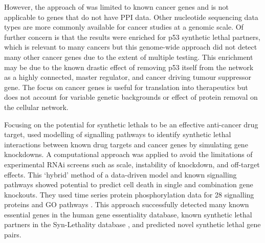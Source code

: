However, the approach of \citet{Kranthi2013} was limited to known \glspl{cancer gene} and is not applicable to genes that do not have \gls{PPI} data. Other nucleotide sequencing data types are more commonly available for cancer studies at a \gls{genomic} scale. Of further concern is that the results were enriched for p53 \gls{synthetic lethal} partners, which is relevant to many \glspl{cancer} but this \gls{genome}-wide approach did not detect many other \glspl{cancer gene} due to the extent of multiple testing. This enrichment may be due to the known drastic effect of removing p53 itself from the network as a highly connected, master regulator, and cancer driving \gls{tumour suppressor} gene. The focus on \glspl{cancer gene} is useful for translation into therapeutics but does not account for variable genetic backgrounds or effect of protein removal on the cellular network.  

Focusing on the potential for \glspl{synthetic lethal} to be an effective anti-cancer drug target, \citet{Zhang2015} used modelling of signalling pathways to identify \gls{synthetic lethal} interactions between known drug targets and \glspl{cancer gene} by simulating gene knockdowns. A computational approach was applied to avoid the limitations of experimental \gls{RNAi} screens such as scale, instability of knockdown, and off-target effects. This `hybrid' method of a data-driven model and known signalling pathways showed potential to predict cell death in single and combination gene knockouts. They used time series protein phosphorylation data \citep{Lee2012} for 28 signalling proteins and \gls{GO} \glspl{pathway} \citep{Ashburner2000, Blake2015}. This approach successfully detected many known \gls{essential} genes in the human gene essentiality database, known \gls{synthetic lethal} partners in the Syn-Lethality database \citep{Li2014}, and predicted novel \gls{synthetic lethal} gene pairs. %

